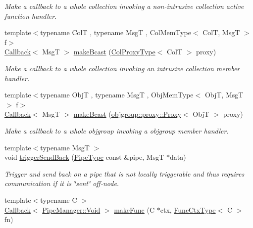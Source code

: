 \begin{DoxyCompactItemize}
\begin{DoxyCompactList}\small\item\em Make a callback to a whole collection invoking a non-\/intrusive collection active function handler. \end{DoxyCompactList}\item 
{\footnotesize template$<$typename ColT , typename MsgT , Col\+Mem\+Type$<$ Col\+T, Msg\+T $>$ f$>$ }\\\hyperlink{namespacevt_a36db99df4c973d48b1118a293fff533f}{Callback}$<$ MsgT $>$ \hyperlink{structvt_1_1pipe_1_1_pipe_manager_a6fb7d87f8beb2c1e80d492df47036158}{make\+Bcast} (\hyperlink{structvt_1_1pipe_1_1_pipe_manager_t_l_af56c58cad882496e35f01227d4da3898}{Col\+Proxy\+Type}$<$ ColT $>$ proxy)
\begin{DoxyCompactList}\small\item\em Make a callback to a whole collection invoking an intrusive collection member handler. \end{DoxyCompactList}\item 
{\footnotesize template$<$typename ObjT , typename MsgT , Obj\+Mem\+Type$<$ Obj\+T, Msg\+T $>$ f$>$ }\\\hyperlink{namespacevt_a36db99df4c973d48b1118a293fff533f}{Callback}$<$ MsgT $>$ \hyperlink{structvt_1_1pipe_1_1_pipe_manager_a4d561c17ce6861401a32892223e434c9}{make\+Bcast} (\hyperlink{structvt_1_1objgroup_1_1proxy_1_1_proxy}{objgroup\+::proxy\+::\+Proxy}$<$ ObjT $>$ proxy)
\begin{DoxyCompactList}\small\item\em Make a callback to a whole objgroup invoking a objgroup member handler. \end{DoxyCompactList}\item 
{\footnotesize template$<$typename MsgT $>$ }\\void \hyperlink{structvt_1_1pipe_1_1_pipe_manager_aaddd05d4eec8fbcbe8134f9c907a7306}{trigger\+Send\+Back} (\hyperlink{namespacevt_ac9852acda74d1896f48f406cd72c7bd3}{Pipe\+Type} const \&pipe, MsgT $\ast$data)
\begin{DoxyCompactList}\small\item\em Trigger and send back on a pipe that is not locally triggerable and thus requires communication if it is \char`\"{}sent\char`\"{} off-\/node. \end{DoxyCompactList}\item 
{\footnotesize template$<$typename C $>$ }\\\hyperlink{namespacevt_a36db99df4c973d48b1118a293fff533f}{Callback}$<$ \hyperlink{structvt_1_1pipe_1_1_pipe_manager_ab720c2580ecfd3ab36e49aeaaff64cc6}{Pipe\+Manager\+::\+Void} $>$ \hyperlink{structvt_1_1pipe_1_1_pipe_manager_a64be0df0367ac73feff93acdd11f9a09}{make\+Func} (C $\ast$ctx, \hyperlink{structvt_1_1pipe_1_1_pipe_manager_base_ad8463823b6b4cfdb67c119d6d22e3bac}{Func\+Ctx\+Type}$<$ C $>$ fn)

\end{DoxyCompactItemize}
